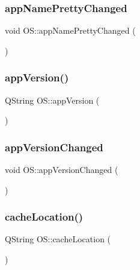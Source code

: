 \mbox{\label{classOS_a21d29e6b9eef2bccc62db0d29d56b4c5}} 
\subsubsection{\texorpdfstring{appNamePrettyChanged}{appNamePrettyChanged}}
{\footnotesize\ttfamily void O\+S\+::app\+Name\+Pretty\+Changed (\begin{DoxyParamCaption}{ }\end{DoxyParamCaption})\hspace{0.3cm}{\ttfamily [signal]}}

\mbox{\label{classOS_ad216acfae668255c7e307e965e5e3a50}} 
\subsubsection{\texorpdfstring{appVersion()}{appVersion()}}
{\footnotesize\ttfamily Q\+String O\+S\+::app\+Version (\begin{DoxyParamCaption}{ }\end{DoxyParamCaption})}

\mbox{\label{classOS_a39f7a3688e008fde1008e6b7e5b5ebcb}} 
\subsubsection{\texorpdfstring{appVersionChanged}{appVersionChanged}}
{\footnotesize\ttfamily void O\+S\+::app\+Version\+Changed (\begin{DoxyParamCaption}{ }\end{DoxyParamCaption})\hspace{0.3cm}{\ttfamily [signal]}}

\mbox{\label{classOS_a44dcb6a2ee199b111d98eb1e364bfef7}} 
\subsubsection{\texorpdfstring{cacheLocation()}{cacheLocation()}}
{\footnotesize\ttfamily Q\+String O\+S\+::cache\+Location (\begin{DoxyParamCaption}{ }\end{DoxyParamCaption})}

